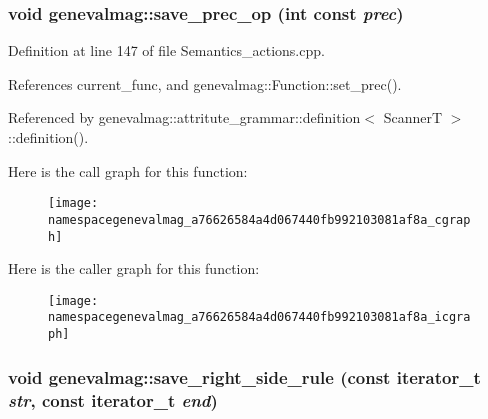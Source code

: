 \hypertarget{namespacegenevalmag_a76626584a4d067440fb992103081af8a}{
\subsubsection[{save\_\-prec\_\-op}]{\setlength{\rightskip}{0pt plus 5cm}void genevalmag::save\_\-prec\_\-op (int const  {\em prec})}}
\label{namespacegenevalmag_a76626584a4d067440fb992103081af8a}


Definition at line 147 of file Semantics\_\-actions.cpp.



References current\_\-func, and genevalmag::Function::set\_\-prec().



Referenced by genevalmag::attritute\_\-grammar::definition$<$ ScannerT $>$::definition().



Here is the call graph for this function:\nopagebreak
\begin{figure}[H]
\begin{center}
\leavevmode
\texttt{[image: namespacegenevalmag\_a76626584a4d067440fb992103081af8a\_cgraph]}
\end{center}
\end{figure}




Here is the caller graph for this function:\nopagebreak
\begin{figure}[H]
\begin{center}
\leavevmode
\texttt{[image: namespacegenevalmag\_a76626584a4d067440fb992103081af8a\_icgraph]}
\end{center}
\end{figure}


\hypertarget{namespacegenevalmag_ab3b5ed3e86e091b48713f1e3a0065d9c}{
\subsubsection[{save\_\-right\_\-side\_\-rule}]{\setlength{\rightskip}{0pt plus 5cm}void genevalmag::save\_\-right\_\-side\_\-rule (const iterator\_\-t {\em str}, \/  const iterator\_\-t {\em end})}}
\label{namespacegenevalmag_ab3b5ed3e86e091b48713f1e3a0065d9c}


